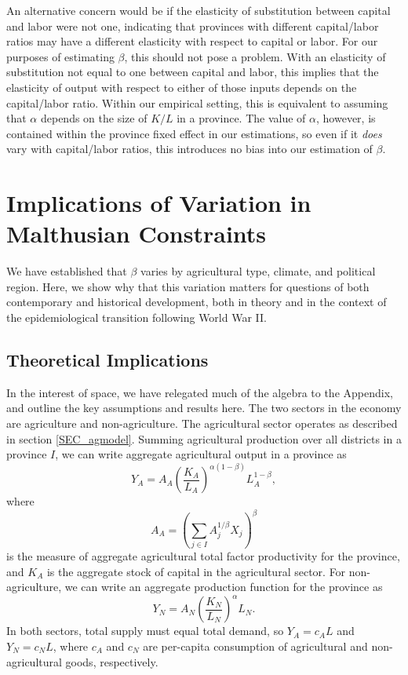 \documentclass[11pt]{article}
\begin{document}
An alternative concern would be if the elasticity of substitution between capital and labor were not one, indicating that provinces with different capital/labor ratios may have a different elasticity with respect to capital or labor. For our purposes of estimating $\beta$, this should not pose a problem. With an elasticity of substitution not equal to one between capital and labor, this implies that the elasticity of output with respect to either of those inputs depends on the capital/labor ratio. Within our empirical setting, this is equivalent to assuming that $\alpha$ depends on the size of $K/L$ in a province. The value of $\alpha$, however, is contained within the province fixed effect in our estimations, so even if it \textit{does} vary with capital/labor ratios, this introduces no bias into our estimation of $\beta$.

\section{Implications of Variation in Malthusian Constraints}\label{SEC_implications}
We have established that $\beta$ varies by agricultural type, climate, and political region. Here, we show why that this variation matters for questions of both contemporary and historical development, both in theory and in the context of the epidemiological transition following World War II. 

\subsection{Theoretical Implications}\label{SEC_model}
In the interest of space, we have relegated much of the algebra to the Appendix, and outline the key assumptions and results here. The two sectors in the economy are agriculture and non-agriculture. The agricultural sector operates as described in section \ref{SEC_agmodel}. Summing agricultural production over all districts in a province $I$, we can write aggregate agricultural output in a province as
\begin{equation}
    Y_A = A_A \left(\frac{K_A}{L_A}\right)^{\alpha(1-\beta)} L_A^{1-\beta}, \label{EQ_caL_solve}
\end{equation}
where 
\begin{equation}
    A_A = \left(\sum_{j\in I} A_{j}^{1/\beta}X_{j} \right)^\beta \nonumber
\end{equation}
is the measure of aggregate agricultural total factor productivity for the province, and $K_A$ is the aggregate stock of capital in the agricultural sector. For non-agriculture, we can write an aggregate production function for the province as
\begin{equation}
    Y_N = A_N \left(\frac{K_N}{L_N}\right)^{\alpha} L_N. \label{EQ_YN}
\end{equation}
In both sectors, total supply must equal total demand, so $Y_A = c_A L$ and $Y_N = c_N L$, where $c_A$ and $c_N$ are per-capita consumption of agricultural and non-agricultural goods, respectively.
\end{document}
